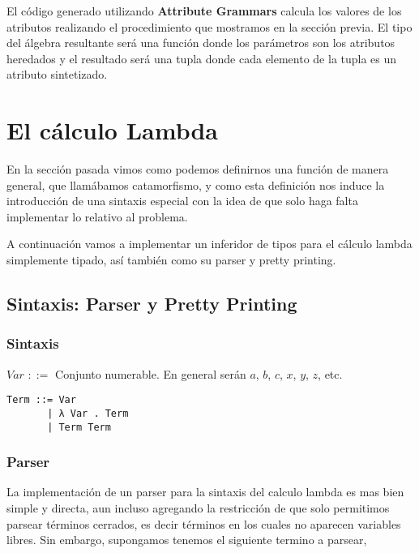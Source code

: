 \documentclass[a4paper,10pt]{article}
\begin{document}
  El código generado utilizando \textbf{Attribute Grammars} calcula los valores de los atributos realizando el procedimiento
  que mostramos en la sección previa. El tipo del álgebra resultante será una función donde los parámetros son los atributos
  heredados y el resultado será una tupla donde cada elemento de la tupla es un atributo sintetizado.
  
  
  
  


\section{El cálculo Lambda}

En la sección pasada vimos como podemos definirnos una función de manera general,
que llamábamos catamorfismo, y como esta definición nos induce la introducción
de una sintaxis especial con la idea de que solo haga falta implementar lo relativo
al problema. 

A continuación vamos a implementar un inferidor de tipos para el cálculo lambda 
simplemente tipado, así también como su parser y pretty printing.

\subsection{Sintaxis: Parser y Pretty Printing}

\subsubsection{Sintaxis}

$Var$ $::=$ Conjunto numerable. En general serán $a$, $b$, $c$, $x$, $y$, $z$, etc.


\begin{lstlisting}
Term ::= Var
       | λ Var . Term
       | Term Term
\end{lstlisting}


\subsubsection{Parser}

La implementación de un parser para la sintaxis del calculo lambda es mas bien
simple y directa, aun incluso agregando la restricción de que solo permitimos parsear
términos cerrados, es decir términos en los cuales no aparecen variables libres.
Sin embargo, supongamos tenemos el siguiente termino a parsear,\\
\end{document}
